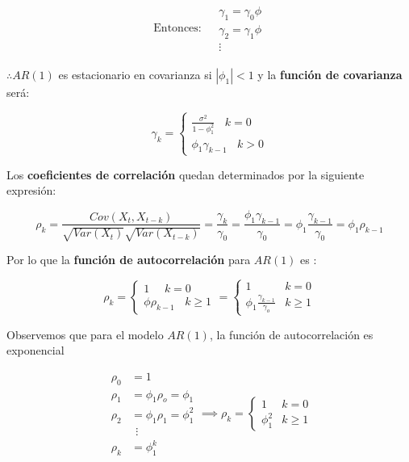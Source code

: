 \documentclass[
  a4paper,
  oneside,
  openany]{book}
\begin{document}
\[
\begin{array}{lc}
\mbox{Entonces: } & 
\begin{array}{c}
\gamma_1= \gamma_0 \phi\\
\gamma_2 =\gamma_1\phi\\
\vdots
\end{array}
\end{array}
\]

\(\therefore AR(1)\) es estacionario en covarianza si \(|\phi_1|<1\) y la \textbf{función de covarianza} será:

\[
\gamma_k=
\left\{
\begin{aligned}
\frac{\sigma^2}{1-\phi_1^2} \ \ \   \  k=0\\
\phi_1 \gamma_{k-1} \ \ \ \ k>0
\end{aligned}
\right.
\]

Los \textbf{coeficientes de correlación} quedan determinados por la siguiente expresión:

\[
\rho_k = \frac{Cov(X_t, X_{t-k})}{\sqrt{Var(X_t)}\sqrt{Var(X_{t-k})}} = \frac{\gamma_k}{\gamma_0} = \frac{\phi_1\gamma_{k-1}}{\gamma_0} = \phi_1\frac{\gamma_{k-1}}{\gamma_0} = \phi_1\rho_{k-1}
\]

Por lo que la \textbf{función de autocorrelación} para \(AR(1)\) es :

\[
\rho_k=
\left\{
\begin{aligned}
 1  \ \ \ \ \ \ k=0\\
\phi \rho_{k-1} \ \ \ \ k\geq 1
\end{aligned}
\right.
= 
\left\{
\begin{array}{lr}
1 &  k=0\\
\phi_1\frac{\gamma_{k-1}}{\gamma_o} & k\geq 1
\end{array}
\right.
\]

Observemos que para el modelo \(AR(1)\), la función de autocorrelación es exponencial

\[
\begin{split}
\rho_0 &= 1\\
\rho_1&=\phi_1\rho_o=\phi_1\\
\rho_2&=\phi_1\rho_1=\phi_1^2\\
&\ \ \vdots\\
\rho_k&=\phi_1^k
\end{split}
\implies
\rho_k=
\left\{
\begin{array}{lr}
 1  & k=0\\
\phi_1^2 & k\geq 1
\end{array}
\right.
\]
\end{document}
